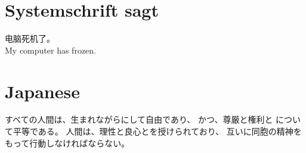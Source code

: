 \documentclass{article}
\begin{document}
    \section{Systemschrift sagt}
        电脑死机了。\\
        My computer has frozen.\\

    \section{Japanese}
        すべての人間は、生まれながらにして自由であり、
        かつ、尊厳と権利と について平等である。
        人間は、理性と良心とを授けられており、
        互いに同胞の精神をもって行動しなければならない。
\end{document}
